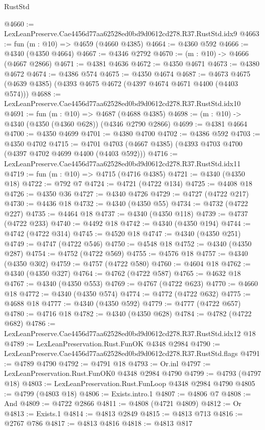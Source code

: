 \begin{lexlean}{RustStd}
\begin{coremodule}
@4660 := LexLeanPreserve.Cae4456d77aa62528ed0bd9d0612cd278.R37.RustStd.idx9
@4663 := fun (m : @10) => @4659 (@4660 @4385)
@4664 := @4360 @592
@4666 := @4340 (@4350 @4664)
@4667 := @4346 @2792
@4670 := (m : @10) -> @4666 (@4667 @2866)
@4671 := @4381 @4636
@4672 := @4350 @4671
@4673 := @4380 @4672
@4674 := @4386 @574
@4675 := @4350 @4674
@4687 := @4673 @4675 (@4639 @4385) (@4393 @4675 @4672 (@4397 @4674 @4671 @4400 (@4403 @574)))
@4688 := LexLeanPreserve.Cae4456d77aa62528ed0bd9d0612cd278.R37.RustStd.idx10
@4691 := fun (m : @10) => @4687 (@4688 @4385)
@4698 := (m : @10) -> @4340 (@4350 (@4360 @628)) (@4346 @2790 @2866)
@4699 := @4381 @4664
@4700 := @4350 @4699
@4701 := @4380 @4700
@4702 := @4386 @592
@4703 := @4350 @4702
@4715 := @4701 @4703 (@4667 @4385) (@4393 @4703 @4700 (@4397 @4702 @4699 @4400 (@4403 @592)))
@4716 := LexLeanPreserve.Cae4456d77aa62528ed0bd9d0612cd278.R37.RustStd.idx11
@4719 := fun (m : @10) => @4715 (@4716 @4385)
@4721 := @4340 (@4350 @18)
@4722 := @792 @7
@4724 := @4721 (@4722 @134)
@4725 := @4408 @18
@4726 := @4350 @36
@4727 := @4340 @4726
@4729 := @4727 (@4722 @217)
@4730 := @4436 @18
@4732 := @4340 (@4350 @55)
@4734 := @4732 (@4722 @227)
@4735 := @4464 @18
@4737 := @4340 (@4350 @118)
@4739 := @4737 (@4722 @233)
@4740 := @4492 @18
@4742 := @4340 (@4350 @194)
@4744 := @4742 (@4722 @314)
@4745 := @4520 @18
@4747 := @4340 (@4350 @251)
@4749 := @4747 (@4722 @546)
@4750 := @4548 @18
@4752 := @4340 (@4350 @287)
@4754 := @4752 (@4722 @569)
@4755 := @4576 @18
@4757 := @4340 (@4350 @302)
@4759 := @4757 (@4722 @580)
@4760 := @4604 @18
@4762 := @4340 (@4350 @327)
@4764 := @4762 (@4722 @587)
@4765 := @4632 @18
@4767 := @4340 (@4350 @553)
@4769 := @4767 (@4722 @623)
@4770 := @4660 @18
@4772 := @4340 (@4350 @574)
@4774 := @4772 (@4722 @632)
@4775 := @4688 @18
@4777 := @4340 (@4350 @592)
@4779 := @4777 (@4722 @657)
@4780 := @4716 @18
@4782 := @4340 (@4350 @628)
@4784 := @4782 (@4722 @682)
@4786 := LexLeanPreserve.Cae4456d77aa62528ed0bd9d0612cd278.R37.RustStd.idx12 @18
@4789 := LexLeanPreservation.Rust.FunOK @4348 @2984
@4790 := LexLeanPreserve.Cae4456d77aa62528ed0bd9d0612cd278.R37.RustStd.flags
@4791 := @4789 @4790
@4792 := @4791 @18
@4793 := Or.inl
@4797 := LexLeanPreservation.Rust.FunOK0 @4348 @2984 @4790
@4799 := @4793 (@4797 @18)
@4803 := LexLeanPreservation.Rust.FunLoop @4348 @2984 @4790
@4805 := @4799 (@4803 @18)
@4806 := Exists.intro.{1}
@4807 := @4806 @7
@4808 := And
@4809 := @4722 @2866
@4811 := @4808 (@4721 @4809)
@4812 := Or
@4813 := Exists.{1}
@4814 := @4813 @2849
@4815 := @4813 @713
@4816 := @2767 @786
@4817 := @4813 @4816
@4818 := @4813 @817

\end{coremodule}
\end{lexlean}

